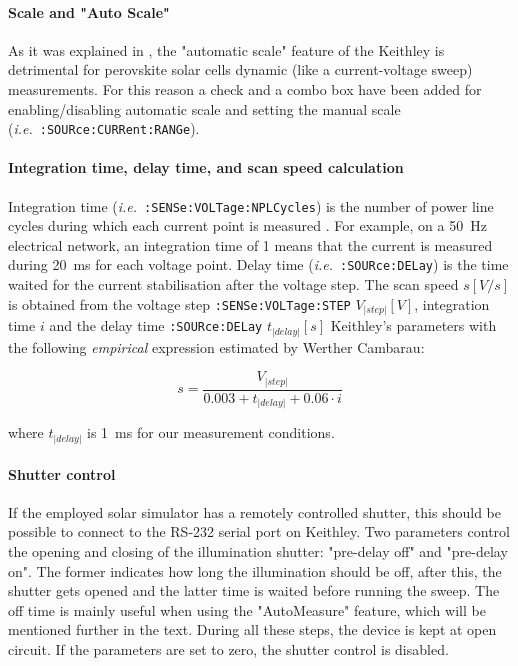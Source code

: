 		\paragraph{Scale and "Auto Scale"}
		As it was explained in , the "automatic scale" feature of the Keithley is detrimental for perovskite solar cells dynamic (like a current\hyp{}voltage sweep) measurements.
		For this reason a check and a combo box have been added for enabling\-/disabling automatic scale and setting the manual scale (\textsl{i.e.}\ \texttt{:SOURce:\-CURRent:\-RANGe}).

		\paragraph{Integration time, delay time, and scan speed calculation}
		Integration time (\textsl{i.e.}\ \texttt{:SENSe:\-VOLTage:\-NPLCycles}) is the number of power line cycles during which each current point is measured \cite{KeithleyInstruments2011}.
		For example, on a \SI{50}{\Hz} electrical network, an integration time of 1 means that the current is measured during \SI{20}{\ms} for each voltage point.
		Delay time (\textsl{i.e.}\ \texttt{:SOURce:\-DELay}) is the time waited for the current stabilisation after the voltage step.
		The scan speed $s[V/s]$ is obtained from the voltage step \texttt{:SENSe:\-VOLTage:\-STEP} $V_|step|[V]$, integration time $i$ and the delay time \texttt{:SOURce:\-DELay} $t_|delay|[s]$ Keithley's parameters with the following \textit{empirical} expression estimated by Werther Cambarau:

		\begin{equation}
			s = \frac{V_|step|}{0.003 + t_|delay| + 0.06 \cdot i}
		\end{equation}

		where $t_|delay|$ is \SI{1}{\ms} for our measurement conditions.

		\paragraph{Shutter control}
		If the employed solar simulator has a remotely controlled shutter, this should be possible to connect to the RS-232 serial port on Keithley.
		Two parameters control the opening and closing of the illumination shutter: "pre-delay off" and "pre-delay on".
		The former indicates how long the illumination should be off, after this, the shutter gets opened and the latter time is waited before running the sweep.
		The off time is mainly useful when using the "AutoMeasure" feature, which will be mentioned further in the text.
		During all these steps, the device is kept at open circuit.
		If the parameters are set to zero, the shutter control is disabled.


